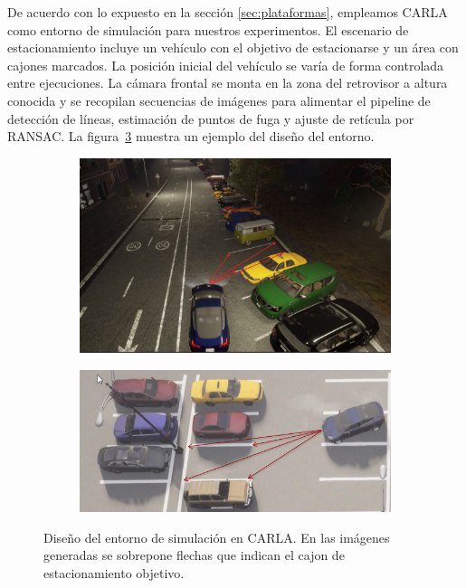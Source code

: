 
De acuerdo con lo expuesto en la sección \ref{sec:plataformas},
empleamos CARLA como entorno de simulación para nuestros experimentos.
El escenario de estacionamiento incluye un vehículo con el objetivo de estacionarse y un área con cajones marcados. La posición inicial del vehículo se varía de forma controlada entre ejecuciones. La cámara frontal se monta en la zona del retrovisor a altura conocida y se recopilan secuencias de imágenes para alimentar el pipeline de detección de líneas, estimación de puntos de fuga y ajuste de retícula por RANSAC. La figura~\ref{fig:simulation-design} muestra un ejemplo del diseño del entorno.

\begin{figure}[!ht]
    \centering
    \begin{subfigure}{0.4\textwidth}
        \includegraphics[width=\textwidth]{img/distances}\label {fig:distances}
    \end{subfigure}
    \begin{subfigure}{0.4\textwidth}
        \includegraphics[width=\textwidth]{img/distances2}\label {fig:distances2}
    \end{subfigure}

    \caption{Diseño del entorno de simulación en CARLA. En las imágenes generadas se sobrepone flechas que indican el cajon de estacionamiento objetivo.}
    \label{fig:simulation-design}
\end{figure}


